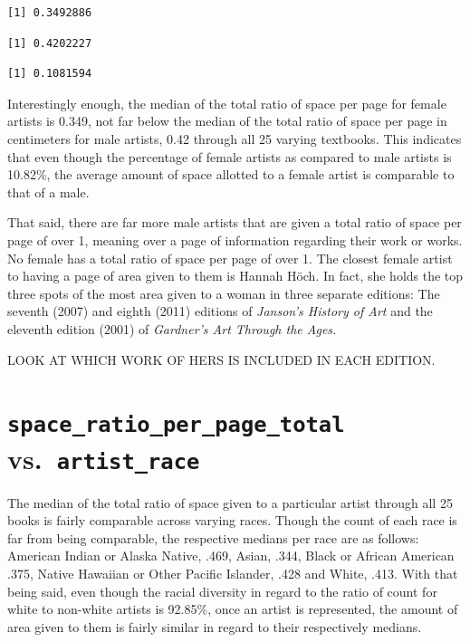 \documentclass[
  letterpaper,
  DIV=11,
  numbers=noendperiod]{scrreprt}
\begin{document}
\begin{verbatim}
[1] 0.3492886
\end{verbatim}

\begin{verbatim}
[1] 0.4202227
\end{verbatim}

\begin{verbatim}
[1] 0.1081594
\end{verbatim}

Interestingly enough, the median of the total ratio of space per page
for female artists is 0.349, not far below the median of the total ratio
of space per page in centimeters for male artists, 0.42 through all 25
varying textbooks\emph{.} This indicates that even though the percentage
of female artists as compared to male artists is 10.82\%, the average
amount of space allotted to a female artist is comparable to that of a
male.

That said, there are far more male artists that are given a total ratio
of space per page of over 1, meaning over a page of information
regarding their work or works. No female has a total ratio of space per
page of over 1. The closest female artist to having a page of area given
to them is Hannah Höch. In fact, she holds the top three spots of the
most area given to a woman in three separate editions: The seventh
(2007) and eighth (2011) editions of \emph{Janson's History of Art} and
the eleventh edition (2001) of \emph{Gardner's Art Through the Ages.}

LOOK AT WHICH WORK OF HERS IS INCLUDED IN EACH EDITION.

\hypertarget{space_ratio_per_page_total-vs.-artist_race}{%
\section{\texorpdfstring{\texttt{space\_ratio\_per\_page\_total}
vs.~\texttt{artist\_race}}{space\_ratio\_per\_page\_total vs.~artist\_race}}\label{space_ratio_per_page_total-vs.-artist_race}}

The median of the total ratio of space given to a particular artist
through all 25 books is fairly comparable across varying races. Though
the count of each race is far from being comparable, the respective
medians per race are as follows: American Indian or Alaska Native, .469,
Asian, .344, Black or African American .375, Native Hawaiian or Other
Pacific Islander, .428 and White, .413. With that being said, even
though the racial diversity in regard to the ratio of count for white to
non-white artists is 92.85\%, once an artist is represented, the amount
of area given to them is fairly similar in regard to their respectively
medians.
\end{document}
